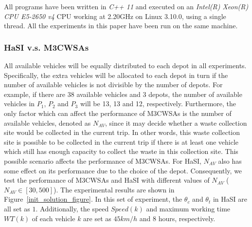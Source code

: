 \documentclass[journal]{IEEEtran}
\begin{document}
All programs have been written in \emph{C++ 11} and executed on an \emph{Intel(R) Xeon(R) CPU E5-2650 v4} CPU working at 2.20GHz on Linux 3.10.0, using a single thread. All the experiments in this paper have been run on the same machine.

\subsubsection{HaSI v.s. M3CWSAs}\label{sec:result_cwsa}
All available vehicles will be equally distributed to each depot in all experiments. Specifically, the extra vehicles will be allocated to each depot in turn if the number of available vehicles is not divisible by the number of depots. For example, if there are 38 available vehicles and 3 depots, the number of available vehicles in $P_1$, $P_2$ and $P_3$ will be 13, 13 and 12, respectively. Furthermore, the only factor which can affect the performance of M3CWSAs is the number of available vehicles, denoted as $N_{AV}$, since it may decide whether a waste collection site would be collected in the current trip. In other words, this waste collection site is possible to be collected in the current trip if there is at least one vehicle which still has enough capacity to collect the waste in this collection site. This possible scenario affects the performance of M3CWSAs. For HaSI, $N_{AV}$ also has some effect on its performance due to the choice of the depot. Consequently, we test the performance of M3CWSAs and HaSI with different values of $N_{AV}$ ($N_{AV} \in [30, 500]$). The experimental results are shown in Figure~\ref{init_solution_figure}. In this set of experiment, the $\theta_c$ and $\theta_t$ in HaSI are all set as $1$. Additionally, the speed  $Speed(k)$ and maximum working time $WT(k)$ of each vehicle $k$ are set as $45 km/h$ and $8$ hours, respectively.
\end{document}
